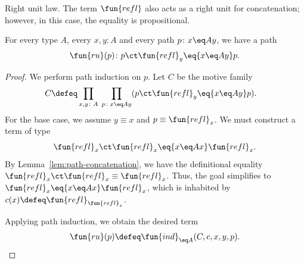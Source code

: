 \begin{lpar}{Right unit law.}\label{lpar:right-unit-law}
    The term $\fun{refl}$ also acts as a right unit for concatenation; however, in this case, the equality is propositional.
    
    \begin{lem}\label{lem:right-unit-law}
        For every type\/ $A$, every\/ $x,y\colon A$ and every path\/ $p\colon x\eq Ay$, we have a path
        \[
            \fun{ru}(p)\colon p\ct\fun{refl}_y\eq{x\eq Ay}p.
        \]
    \end{lem}
    
    \begin{proof}
        We perform path induction on $p$. Let $C$ be the motive family
        \begin{align*}
            C&\defeq\prod_{x,y\colon A}\;\prod_{p\colon x\eq Ay}
                (p\ct\fun{refl}_y\eq{x\eq Ay}p).
        \end{align*}
        For the base case, we assume $y \equiv x$ and $p \equiv \fun{refl}_x$. We must construct a term of type
        \[
            \fun{refl}_x\ct\fun{refl}_x\eq{x\eq Ax}\fun{refl}_x.
        \]
        By Lemma~\ref{lem:path-concatenation}, we have the definitional equality $\fun{refl}_x\ct\fun{refl}_x\equiv\fun{refl}_x$. Thus, the goal simplifies to $\fun{refl}_x\eq{x\eq Ax}\fun{refl}_x$, which is inhabited by $c(x)\defeq\fun{refl}_{\fun{refl}_x}$.
    
        Applying path induction, we obtain the desired term
        \[
            \fun{ru}(p) \defeq \fun{ind}_{\eq A}(C,c,x,y,p).
        \]
    \end{proof}
\end{lpar}

